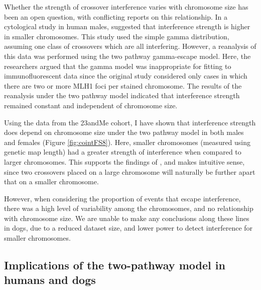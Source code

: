 Whether the strength of crossover interference varies with chromosome size has been an open question, with conflicting reports on this relationship.
In a cytological study in human males, \citet{Lian2008} suggested that interference strength is higher in smaller chromosomes. %
This study used the simple gamma distribution, assuming one class of crossovers which are all interfering.
However, a reanalysis of this data was performed using the two pathway gamma-escape model\cite{Housworth2009}.
Here, the researchers argued that the gamma model was inappropriate for fitting to immunofluorescent data since the original study considered only cases in which there are two or more MLH1 foci per stained chromosome.
The results of the reanalysis under the two pathway model indicated that interference strength remained constant and independent of chromosome size\cite{Housworth2009}.

Using the data from the 23andMe cohort, I have shown that interference strength does depend on chromosome size under the two pathway model in both males and females (Figure \ref{fig:cointFS8}).
Here, smaller chromosomes (measured using genetic map length) had a greater strength of interference when compared to larger chromosomes.
This supports the findings of \citet{Lian2008}, and
makes intuitive sense, since two crossovers placed on a large chromosome will naturally be further apart that on a smaller chromosome.

However, when considering the proportion of events that escape interference, there was a high level of variability among the chromosomes, and no relationship with chromosome size.
We are unable to make any conclusions along these lines in dogs, due to a reduced dataset size, and lower power to detect interference for smaller chromosomes.


\subsection{Implications of the two-pathway model in humans and dogs}

